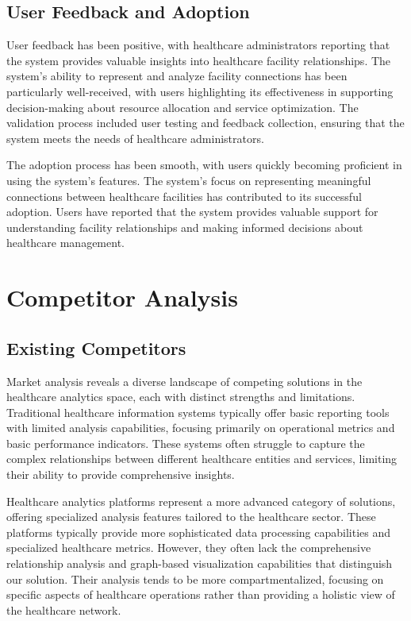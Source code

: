 \documentclass[12pt,a4paper]{report}
\begin{document}
\section{User Feedback and Adoption}
User feedback has been positive, with healthcare administrators reporting that the system provides valuable insights into healthcare facility relationships. The system's ability to represent and analyze facility connections has been particularly well-received, with users highlighting its effectiveness in supporting decision-making about resource allocation and service optimization. The validation process included user testing and feedback collection, ensuring that the system meets the needs of healthcare administrators.

The adoption process has been smooth, with users quickly becoming proficient in using the system's features. The system's focus on representing meaningful connections between healthcare facilities has contributed to its successful adoption. Users have reported that the system provides valuable support for understanding facility relationships and making informed decisions about healthcare management.

\chapter{Competitor Analysis}
\section{Existing Competitors}
Market analysis reveals a diverse landscape of competing solutions in the healthcare analytics space, each with distinct strengths and limitations. Traditional healthcare information systems typically offer basic reporting tools with limited analysis capabilities, focusing primarily on operational metrics and basic performance indicators. These systems often struggle to capture the complex relationships between different healthcare entities and services, limiting their ability to provide comprehensive insights.

Healthcare analytics platforms represent a more advanced category of solutions, offering specialized analysis features tailored to the healthcare sector. These platforms typically provide more sophisticated data processing capabilities and specialized healthcare metrics. However, they often lack the comprehensive relationship analysis and graph-based visualization capabilities that distinguish our solution. Their analysis tends to be more compartmentalized, focusing on specific aspects of healthcare operations rather than providing a holistic view of the healthcare network.
\end{document}
